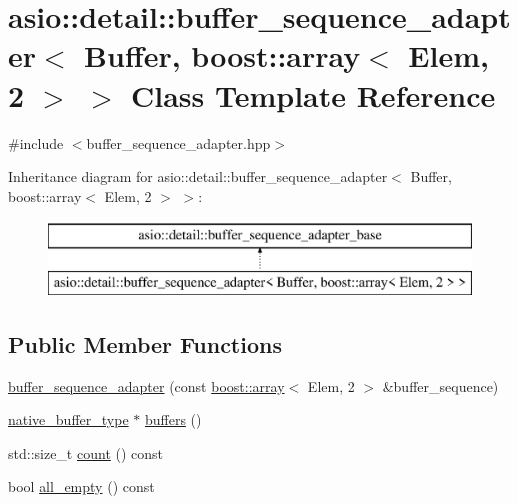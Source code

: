 \hypertarget{classasio_1_1detail_1_1buffer__sequence__adapter_3_01_buffer_00_01boost_1_1array_3_01_elem_00_012_01_4_01_4}{}\section{asio\+:\+:detail\+:\+:buffer\+\_\+sequence\+\_\+adapter$<$ Buffer, boost\+:\+:array$<$ Elem, 2 $>$ $>$ Class Template Reference}
\label{classasio_1_1detail_1_1buffer__sequence__adapter_3_01_buffer_00_01boost_1_1array_3_01_elem_00_012_01_4_01_4}


{\ttfamily \#include $<$buffer\+\_\+sequence\+\_\+adapter.\+hpp$>$}

Inheritance diagram for asio\+:\+:detail\+:\+:buffer\+\_\+sequence\+\_\+adapter$<$ Buffer, boost\+:\+:array$<$ Elem, 2 $>$ $>$\+:\begin{figure}[H]
\begin{center}
\leavevmode
\includegraphics[height=2.000000cm]{classasio_1_1detail_1_1buffer__sequence__adapter_3_01_buffer_00_01boost_1_1array_3_01_elem_00_012_01_4_01_4}
\end{center}
\end{figure}
\subsection*{Public Member Functions}
\begin{DoxyCompactItemize}
\item 
\hyperlink{classasio_1_1detail_1_1buffer__sequence__adapter_3_01_buffer_00_01boost_1_1array_3_01_elem_00_012_01_4_01_4_aa1ffc7826198838ad79f17fd9b7fe580}{buffer\+\_\+sequence\+\_\+adapter} (const \hyperlink{classboost_1_1array}{boost\+::array}$<$ Elem, 2 $>$ \&buffer\+\_\+sequence)
\item 
\hyperlink{classasio_1_1detail_1_1buffer__sequence__adapter__base_a91d037bd052777b8df514e6b94ec9e71}{native\+\_\+buffer\+\_\+type} $\ast$ \hyperlink{classasio_1_1detail_1_1buffer__sequence__adapter_3_01_buffer_00_01boost_1_1array_3_01_elem_00_012_01_4_01_4_a53cb0025addcbf70bf5318dc6ed1af9d}{buffers} ()
\item 
std\+::size\+\_\+t \hyperlink{classasio_1_1detail_1_1buffer__sequence__adapter_3_01_buffer_00_01boost_1_1array_3_01_elem_00_012_01_4_01_4_a0e3a0d4b2706eaec1a89c0ad06bf38e2}{count} () const 
\item 
bool \hyperlink{classasio_1_1detail_1_1buffer__sequence__adapter_3_01_buffer_00_01boost_1_1array_3_01_elem_00_012_01_4_01_4_a8e662f41738e0a9728e48f0ddc8b17cf}{all\+\_\+empty} () const 
\end{DoxyCompactItemize}
